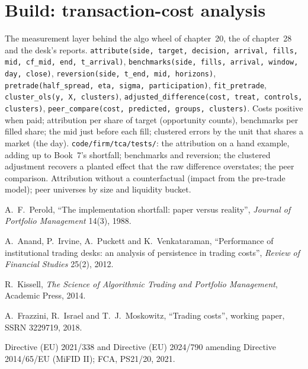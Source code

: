 \section{Build: transaction-cost analysis}\label{bld:mx:transaction-cost-analysis:tca}

\begin{build}
 The measurement layer behind the algo wheel of chapter~20, the  of chapter~28 and the desk's reports.
 \texttt{attribute(side, target, decision, arrival, fills, mid, cf\_mid, end, t\_arrival)}, \texttt{benchmarks(side, fills, arrival,
window, day, close)}, \texttt{reversion(side, t\_end, mid, horizons)}, \texttt{pretrade(half\_spread, eta, sigma, participation)},
\texttt{fit\_pretrade}, \texttt{cluster\_ols(y, X, clusters)}, \texttt{adjusted\_difference(cost, treat, controls, clusters)},
\texttt{peer\_compare(cost, predicted, groups, clusters)}.
 Costs positive when paid; attribution per share of target (opportunity counts), benchmarks per filled share; the mid just before each
fill; clustered errors by the unit that shares a market (the day).
 \texttt{code/firm/tca/tests/}: the attribution on a hand example, adding up to Book~7's shortfall; benchmarks and reversion;
the clustered adjustment recovers a planted effect that the raw difference overstates; the peer comparison.
 Attribution without a counterfactual (impact from the pre-trade model); peer universes by size and liquidity bucket.
\end{build}

\begin{omsources}
\item A.~F.~Perold, ``The implementation shortfall: paper versus reality'', \emph{Journal of Portfolio Management} 14(3), 1988.
\item A.~Anand, P.~Irvine, A.~Puckett and K.~Venkataraman, ``Performance of institutional trading desks: an analysis of persistence in trading
costs'', \emph{Review of Financial Studies} 25(2), 2012.
\item R.~Kissell, \emph{The Science of Algorithmic Trading and Portfolio Management}, Academic Press, 2014.
\item A.~Frazzini, R.~Israel and T.~J.~Moskowitz, ``Trading costs'', working paper, SSRN 3229719, 2018.
\item Directive (EU) 2021/338 and Directive (EU) 2024/790 amending Directive 2014/65/EU (MiFID II); FCA, PS21/20, 2021.
\end{omsources}

